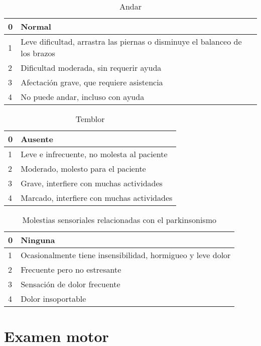 \begin{table}[H]
\begin{center}
\begin{tabular}{|p{1cm}|p{11cm}|}
\hline
0 & Normal \\\hline
1 & Leve dificultad, arrastra las piernas o disminuye el balanceo de los brazos \\\hline
2 & Dificultad moderada, sin requerir ayuda\\\hline
3 & Afectación grave, que requiere asistencia \\\hline
4 & No puede andar, incluso con ayuda\\\hline
\end{tabular}
\caption{Andar}
\end{center}
\end{table}

\begin{table}[H]
\begin{center}
\begin{tabular}{|p{1cm}|p{11cm}|}
\hline
0 & Ausente \\\hline
1 & Leve e infrecuente, no molesta al paciente \\\hline
2 & Moderado, molesto para el paciente\\\hline
3 & Grave, interfiere con muchas actividades \\\hline
4 & Marcado, interfiere con muchas actividades\\\hline
\end{tabular}
\caption{Temblor}
\end{center}
\end{table}

\begin{table}[H]
\begin{center}
\begin{tabular}{|p{1cm}|p{11cm}|}
\hline
0 & Ninguna \\\hline
1 & Ocasionalmente tiene insensibilidad, hormigueo y leve dolor \\\hline
2 & Frecuente pero no estresante\\\hline
3 & Sensación de dolor frecuente \\\hline
4 & Dolor insoportable\\\hline
\end{tabular}
\caption{Molestias sensoriales relacionadas con el parkinsonismo}
\end{center}
\end{table}

\section{Examen motor} 

